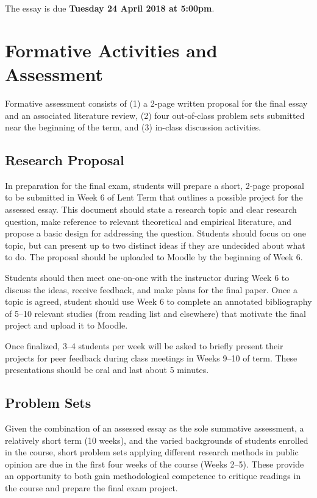 \documentclass[12pt,a4paper]{article}
\begin{document}
\vspace{1em}

\noindent The essay is due \textbf{Tuesday 24 April 2018 at 5:00pm}.


\section{Formative Activities and Assessment}

Formative assessment consists of (1) a 2-page written proposal for the final essay and an associated literature review, (2) four out-of-class problem sets submitted near the beginning of the term, and (3) in-class discussion activities.

\subsection{Research Proposal}

In preparation for the final exam, students will prepare a short, 2-page proposal to be submitted in Week 6 of Lent Term that outlines a possible project for the assessed essay. This document should state a research topic and clear research question, make reference to relevant theoretical and empirical literature, and propose a basic design for addressing the question. Students should focus on one topic, but can present up to two distinct ideas if they are undecided about what to do. The proposal should be uploaded to Moodle by the beginning of Week 6.

Students should then meet one-on-one with the instructor during Week 6 to discuss the ideas, receive feedback, and make plans for the final paper. Once a topic is agreed, student should use Week 6 to complete an annotated bibliography of 5--10 relevant studies (from reading list and elsewhere) that motivate the final project and upload it to Moodle.

Once finalized, 3--4 students per week will be asked to briefly present their projects for peer feedback during class meetings in Weeks 9--10 of term. These presentations should be oral and last about 5 minutes.

\subsection{Problem Sets}

Given the combination of an assessed essay as the sole summative assessment, a relatively short term (10 weeks), and the varied backgrounds of students enrolled in the course, short problem sets applying different research methods in public opinion are due in the first four weeks of the course (Weeks 2--5). These provide an opportunity to both gain methodological competence to critique readings in the course and prepare the final exam project.
\end{document}
